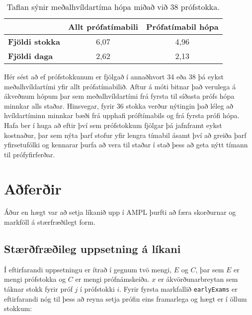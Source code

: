 \documentclass[12pt]{article}
\begin{document}
\begin{table}[h]
    \centering
    \begin{tabular}{l|c|c|}
        \cline{2-3}
        & \multicolumn{1}{l|}{\textbf{Allt prófatímabili}} & \multicolumn{1}{l|}{\textbf{Prófatímabil hópa}} \\ \hline
        \multicolumn{1}{|l|}{\textbf{Fjöldi stokka}} & 6,07                                             & 4,96                                            \\ \hline
        \multicolumn{1}{|l|}{\textbf{Fjöldi daga}}   & 2,62                                             & 2,13                                            \\ \hline
    \end{tabular}
    \caption{Taflan sýnir meðalhvíldartíma hópa miðað við 38 prófstokka.}
\end{table}


Hér sést að ef prófstokkunum er fjölgað í annaðhvort 34 eða 38 þá eykst meðalhvíldartími yfir allt prófatímabilið. Aftur á móti bitnar það verulega á ákveðnum hópum þar sem meðalhvíldartími frá fyrsta til síðasta prófs hópa minnkar alls staðar. Hinsvegar, fyrir 36 stokka verður nýtingin það léleg að hvíldartíminn minnkar bæði frá upphafi próftímabils og frá fyrsta prófi hópa. Hafa ber í huga að eftir því sem prófstokkum fjölgar þá jafnframt eykst kostnaður, þar sem nýta þarf stofur yfir lengra tímabil ásamt því að greiða þarf yfirsetufólki og kennarar þurfa að vera til staðar í stað þess að geta nýtt tímann til prófyfirferðar.
\newpage

\section{Aðferðir}

Áður en hægt var að setja líkanið upp í AMPL þurfti að færa skorðurnar og markföll á stærfræðilegt form. 

\subsection{Stærðfræðileg uppsetning á líkani}

\medskip
Í eftirfarandi uppsetningu er ítrað í gegnum tvö mengi, $ E $ og $ C $, þar sem $ E $ er mengi prófstokka og $ C $ er mengi prófnámskeiða. $ x $ er ákvörðunarbreytan sem táknar stokk fyrir próf $ j $ í prófstokki $ i $. Fyrir fyrsta markfallið \texttt{earlyExams} er eftirfarandi nóg til þess að reyna setja prófin eins framarlega og hægt er í öllum stokkum:
\end{document}
